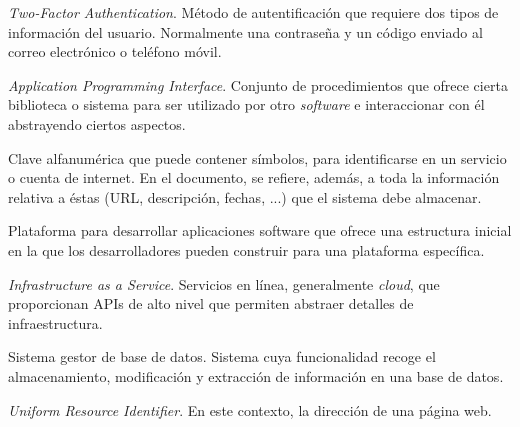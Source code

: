 \documentclass{article}
\begin{document}
\begin{description}
   \setlength\itemsep{0em}
   \item[2FA] \textit{Two-Factor Authentication}. Método de autentificación que requiere dos tipos de información del usuario. Normalmente una contraseña y un código enviado al correo electrónico o teléfono móvil.
   \item[API] \textit{Application Programming Interface}. Conjunto de procedimientos que ofrece cierta biblioteca o sistema para ser utilizado por otro \textit{software} e interaccionar con él abstrayendo ciertos aspectos.
   \item[Contraseña] Clave alfanumérica que puede contener símbolos, para identificarse en un servicio o cuenta de internet. En el documento, se refiere, además, a toda la información relativa a éstas (URL, descripción, fechas, ...) que el sistema debe almacenar.
   \item[Framework] Plataforma para desarrollar aplicaciones software que ofrece una estructura inicial en la que los desarrolladores pueden construir para una plataforma específica. 
   \item[IaaS] \textit{Infrastructure as a Service}. Servicios en línea, generalmente \textit{cloud}, que proporcionan APIs de alto nivel que permiten abstraer detalles de infraestructura.
   \item[SGBD] Sistema gestor de base de datos. Sistema cuya funcionalidad recoge el almacenamiento, modificación y extracción de información en una base de datos.
   \item[URL] \textit{Uniform Resource Identifier}. En este contexto, la dirección de una página web. 
\end{description}
\end{document}
